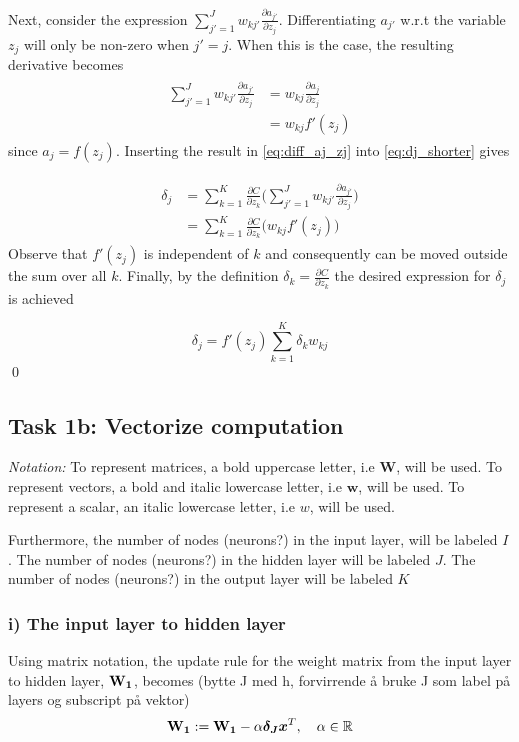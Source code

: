 \documentclass{article}
\begin{document}
Next, consider the expression $\sum_{j'=1}^J w_{kj'} \frac{\partial a_{j'}}{\partial z_j}$. Differentiating $a_{j'}$ w.r.t the variable $z_j$ will only be non-zero when $j' = j$. When this is the case, the resulting derivative becomes
\begin{align}
\begin{split}
    \sum_{j'=1}^J w_{kj'} \frac{\partial a_{j'}}{\partial z_j} &= w_{kj}\frac{\partial a_j}{\partial z_j} \\ &= w_{kj} f'(z_j)
\end{split}
\label{eq:diff_aj_zj}
\end{align}
since $a_j = f(z_j)$. Inserting the result in \eqref{eq:diff_aj_zj} into \eqref{eq:dj_shorter} gives

\begin{align}
\begin{split}
     \delta_j &= \sum_{k=1}^K \frac{\partial C}{\partial z_k} \bigg(\sum_{j'=1}^J w_{kj'} \frac{\partial a_{j'}}{\partial z_j} \bigg) \\
     &=\sum_{k=1}^K \frac{\partial C}{\partial z_k} \bigg( w_{kj} f'(z_j)\bigg)
\end{split}
\label{eq:almost_there}
\end{align}
Observe that $f'(z_j)$ is independent of $k$ and consequently can be moved outside the sum over all $k$. Finally, by the definition $\delta_k = \frac{\partial C}{\partial z_k}$ the desired expression for $\delta_j$ is achieved

\begin{equation}
    \delta_j = f'(z_j) \sum_{k=1}^K \delta_k w_{kj}
\end{equation}
\qed
\subsection{Task 1b: Vectorize computation}
\textit{Notation:} To represent matrices, a bold uppercase letter, i.e \textbf{W}, will be used. To represent vectors, a bold and italic lowercase letter, i.e $\boldsymbol{w}$, will be used. To represent a scalar, an italic lowercase letter, i.e $w$, will be used. 

Furthermore, the number of nodes (neurons?) in the input layer, will be labeled $I$. The number of nodes (neurons?) in the hidden layer will be labeled $J$. The number of nodes (neurons?) in the output layer will be labeled $K$


\subsubsection*{i) The input layer to hidden layer} 
Using matrix notation, the update rule for the weight matrix from the input layer to hidden layer, $\text{\textbf{W}}_\textbf{1}$, becomes (bytte J med h, forvirrende å bruke J som label på layers og subscript på vektor)
\begin{equation}
    \text{\textbf{W}}_\textbf{1} := \text{\textbf{W}}_\textbf{1} - \alpha \boldsymbol{\delta_J} \boldsymbol{x}^T, \quad \alpha \in \mathbb{R}
    \label{eq:matrix_hidden}
\end{equation}
\end{document}
